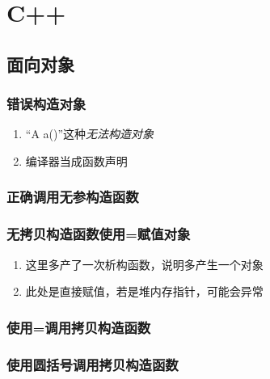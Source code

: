 \documentclass{../main.tex}{subfiles}
\begin{document}
\chapter{C++}
\section{面向对象}
\subsection{错误构造对象}

\begin{enumerate}[labelindent=0pt, itemsep=0pt, parsep=0pt, topsep=0pt, partopsep=0pt]
    \item ``A a()''这种\emph{无法构造对象}
    \item 编译器当成函数声明
\end{enumerate}

\subsection{正确调用无参构造函数}


\subsection{无拷贝构造函数使用=赋值对象}

\begin{enumerate}[labelindent=0pt, itemsep=0pt, parsep=0pt, topsep=0pt, partopsep=0pt]
    \item 这里多产了一次析构函数，说明多产生一个对象
    \item 此处是直接赋值，若是堆内存指针，可能会异常
\end{enumerate}

\subsection{使用=调用拷贝构造函数}


\subsection{使用圆括号调用拷贝构造函数}

\end{document}
